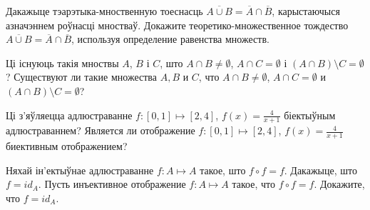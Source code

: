 \begin{problemList}
\bigskip

\problemItemSimple
{Дакажыце тэарэтыка-мноственную тоеснасць $\overline{A \cup B} = \overline{A} \cap \overline{B}$, карыстаючыся азначэннем роўнасці мностваў.}
{Докажите теоретико-множественное тождество $\overline{A \cup B} = \overline{A} \cap \overline{B}$, используя определение равенства множеств.}

\bigskip

\problemItemSimple
{Ці існуюць такія мноствы $A$, $B$ і $C$, што $A \cap B \neq \emptyset$, $A \cap C = \emptyset$ і $(A \cap B) \setminus C = \emptyset$?}
{Существуют ли такие множества $A, B$ и $C$, что $A \cap B \neq \emptyset$, $A \cap C = \emptyset$ и $(A \cap B) \setminus C = \emptyset$?}

\bigskip

\problemItemSimple
{Ці з'яўляецца адлюстраванне $f: [0, 1] \mapsto [2, 4]$, $f(x) = \frac{4}{x + 1}$ біектыўным адлюстраваннем?}
{Является ли отображение $f: [0, 1] \mapsto [2, 4]$, $f(x) = \frac{4}{x + 1}$ биективным отображением?}

\bigskip

\problemItemSimple
{Няхай ін'ектыўнае адлюстраванне $f: A \mapsto A$ такое, што $f \circ f = f$. Дакажыце, што $f = id_{A}$.}
{Пусть инъективное отображение $f: A \mapsto A$ такое, что $f \circ f = f$. Докажите, что $f = id_{A}$.}

\end{problemList}



